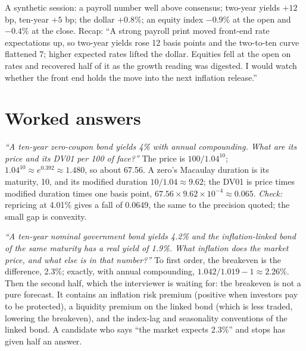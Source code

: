\begin{example}\label{ex:iv:fixed-income-and-markets:recap}
A synthetic session: a payroll number well above consensus; two-year yields $+12$ bp, ten-year $+5$ bp; the dollar $+0.8\%$;
an equity index $-0.9\%$ at the open and $-0.4\%$ at the close. Recap: ``A strong payroll print moved front-end rate
expectations up, so two-year yields rose 12 basis points and the two-to-ten curve flattened 7; higher expected rates lifted
the dollar. Equities fell at the open on rates and recovered half of it as the growth reading was digested. I would watch
whether the front end holds the move into the next inflation release.''
\end{example}

\section{Worked answers}

\begin{example}\label{ex:iv:fixed-income-and-markets:zero}
\emph{``A ten-year zero-coupon bond yields 4\% with annual compounding. What are its price and its DV01 per 100 of face?''}
The price is $100/1.04^{10}$; $1.04^{10} \approx e^{0.392} \approx 1.480$, so about 67.56. A zero's Macaulay duration is
its maturity, 10, and its modified duration $10/1.04 \approx 9.62$; the DV01 is price times modified duration times one
basis point, $67.56 \times 9.62 \times 10^{-4} \approx 0.065$. \emph{Check:} repricing at 4.01\% gives a fall of 0.0649,
the same to the precision quoted; the small gap is convexity.
\end{example}

\begin{example}\label{ex:iv:fixed-income-and-markets:breakeven}
\emph{``A ten-year nominal government bond yields 4.2\% and the inflation-linked bond of the same maturity has a real
yield of 1.9\%. What inflation does the market price, and what else is in that number?''} To first order, the breakeven is
the difference, 2.3\%; exactly, with annual compounding, $1.042/1.019 - 1 \approx 2.26\%$. Then the second half, which the
interviewer is waiting for: the breakeven is not a pure forecast. It contains an inflation risk premium (positive when
investors pay to be protected), a liquidity premium on the linked bond (which is less traded, lowering the breakeven),
and the index-lag and seasonality conventions of the linked bond. A candidate who says ``the market expects 2.3\%'' and
stops has given half an answer.
\end{example}

